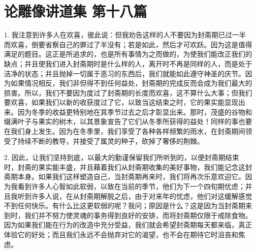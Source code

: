 

\section{论雕像讲道集 第十八篇}

\par

1. 我注意到许多人在欢喜，彼此说：但我劝告这样的人不要因为封斋期已过一半而欢喜，倒要省察自己的罪过了半没有；若是如此，然后才可欢跃。因为这是值得满足的题目。这正是所追求的，也是所有事情为之而做的，为使我们能改正我们的缺点；并且使我们进入封斋期时是什么样的人，离开时不再是同样的人，而是处于洁净的状态；并且抛掉一切属于恶习的东西后，我们就能如此遵守神圣的庆节。因为如果情况相反，我们非但得不到任何益处，封斋期的完成反而会成为我们最大的损害。所以，我们不要因为度过了封斋期的长度而欢喜，这不算什么大事；但我们要欢喜，如果我们以新的收获度过了它，以致当这结束之时，它的果实能显现出来。因为冬季的收益更特别地在其季节过去之后才彰显出来。那时，茂盛的谷物和缀满叶子与果实的树木，以其景象宣告了它们从冬季所获得的益处！同样的事也要在我们身上发生。因为在冬季里，我们享受了各种各样频繁的雨水，在封斋期间领受了持续不断的教导，并接受了属灵的种子，砍掉了奢侈的荆棘。\par

2. 因此，让我们坚持到底，以最大的勤谨保留我们所听到的，以便封斋期结束时，封斋的果实能丰盛，并且藉着我们从封斋期收集的美好事物，我们能记念这封斋期本身。如果我们这样塑造自己，当封斋期再来时，我们将再次乐意欢迎它。因为我看到许多人心智如此软弱，以致在当前的季节，他们为下一个四旬期忧虑；并且我听到许多人说，在从封斋期解脱之后，由于对来年的忧虑，他们对这缓解感觉不到任何快乐。有什么比这更软弱的呢？我问；原因是什么？这是因为当封斋期来到时，我们并不努力使灵魂的事务得到良好的安排，而将封斋期仅限于戒除食物。因为如果我们能在行为的改造中充分受益，我们就会希望封斋期每天都来临，真正体验它的好处；而且我们永远不会抛弃对它的渴望，也不会在期待它时沮丧和焦虑。\par

